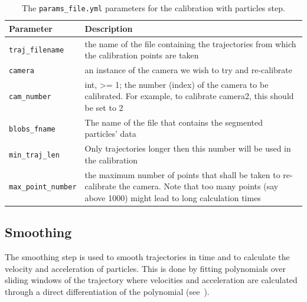 \documentclass[10pt,a4paper]{article}
\begin{document}
\begin{table}[!ht]
	\centering
	\caption{The \texttt{params\_file.yml} parameters for the calibration with particles step.}
	\begin{tabular}{l m{13cm}}
		\hline
		Parameter & Description\\
		\hline
		
		\texttt{traj\_filename} & the name of the file containing the trajectories from
		which the calibration points are taken\\[.5em]
		
		\texttt{camera} & an instance of the camera we wish to try and re-calibrate\\[.5em]
		
		\texttt{cam\_number} & int, >= 1; the number (index) of the camera to be
		calibrated. For example, to calibrate camera2, this should be set to 2\\[.5em]
		
		\texttt{blobs\_fname} & The name of the file that contains the segmented 
		particles' data\\[.5em]
		
		\texttt{min\_traj\_len} & Only trajectories longer then this number will be used in the calibration\\[.5em]
		
		\texttt{max\_point\_number} & the maximum number of points that shall be taken to re-calibrate the camera. Note that too many points (say above 1000) might lead to long calculation times\\[.5em]
		
		\hline
	\end{tabular}
\end{table}








\subsection{Smoothing}\label{sec:workflow_smooth}


The smoothing step is used to smooth trajectories in time and to calculate the velocity and acceleration of particles. This is done by fitting polynomials over sliding windows of the trajectory where velocities and acceleration are calculated through a direct differentiation of the polynomial (see~\cite{Luthi2005}).
\end{document}
